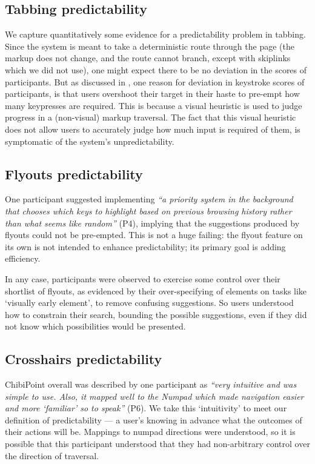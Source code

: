 \documentclass[11pt,openright,a4paper]{report}
\begin{document}
\subsection{Tabbing predictability}
We capture quantitatively some evidence for a predictability problem in tabbing. Since the system is meant to take a deterministic route through the page (the markup does not change, and the route cannot branch, except with skiplinks which we did not use), one might expect there to be no deviation in the scores of participants. But as discussed in , one reason for deviation in keystroke scores of participants, is that users overshoot their target in their haste to pre-empt how many keypresses are required. This is because a visual heuristic is used to judge progress in a (non-visual) markup traversal. The fact that this visual heuristic does not allow users to accurately judge how much input is required of them, is symptomatic of the system's unpredictability.

\subsection{Flyouts predictability}
One participant suggested implementing \textit{``a priority system in the background that chooses which keys to highlight based on previous browsing history rather than what seems like random''} (P4), implying that the suggestions produced by flyouts could not be pre-empted. This is not a huge failing: the flyout feature on its own is not intended to enhance predictability; its primary goal is adding efficiency.

In any case, participants were observed to exercise some control over their shortlist of flyouts, as evidenced by their over-specifying of elements on tasks like `visually early element', to remove confusing suggestions. So users understood how to constrain their search, bounding the possible suggestions, even if they did not know which possibilities would be presented.

\subsection{Crosshairs predictability}
ChibiPoint overall was described by one participant as \textit{``very intuitive and was simple to use. Also, it mapped well to the Numpad which made navigation easier and more `familiar' so to speak''} (P6). We take this `intuitivity' to meet our definition of predictability --- a user's knowing in advance what the outcomes of their actions will be. Mappings to numpad directions were understood, so it is possible that this participant understood that they had non-arbitrary control over the direction of traversal.
\end{document}

